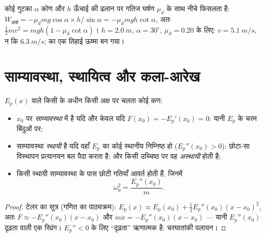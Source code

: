 \begin{example}[घर्षण में खोई ऊर्जा]\label{ex:b1:work-and-energy:friction}
कोई गुटका $\alpha$ कोण और $h$ ऊँचाई की ढलान पर गतिज घर्षण $\mu_d$ के साथ
नीचे फिसलता है: $W_{\text{असं}} = -\mu_dmg\cos\alpha \times
h/\sin\alpha = -\mu_dmgh\cot\alpha$, अतः $\tfrac12 mv^2 = mgh(1 - \mu_d\cot\alpha)$।
$h = \qty{2.0}{m}$, $\alpha = 30^\circ$, $\mu_d = 0.20$ के लिए: $v =
\qty{5.1}{m/s}$, न कि $\qty{6.3}{m/s}$;  का एक तिहाई ऊष्मा बन
गया।
\end{example}

\section{साम्यावस्था, स्थायित्व और कला-आरेख}

\begin{proposition}[एक विमा में साम्यावस्था और स्थायित्व]\label{prop:b1:work-and-energy:stability}
 $E_p(x)$ वाले किसी  के अधीन किसी अक्ष पर चलता कोई
कण:
\begin{itemize}
  \item $x_0$ पर \emph{साम्यावस्था} में है यदि और केवल यदि
        $F(x_0) = -E_p'(x_0) = 0$: यानी $E_p$ के चरम बिंदुओं पर;
  \item साम्यावस्था \emph{स्थायी} है यदि वहाँ $E_p$ का कोई स्थानीय
        निम्निष्ठ हो ($E_p''(x_0) > 0$): छोटा-सा विस्थापन प्रत्यानयन बल
        पैदा करता है; और किसी उच्चिष्ठ पर वह \emph{अस्थायी} होती है;
  \item किसी स्थायी साम्यावस्था के पास छोटी गतियाँ आवर्त होती हैं, जिनमें
        \[
        \omega_0^2 = \frac{E_p''(x_0)}{m} .
        \]
\end{itemize}
\end{proposition}

\begin{proof}
टेलर का सूत्र (गणित का पाठ्यक्रम): $E_p(x) \approx E_p(x_0) +
\tfrac12 E_p''(x_0)(x - x_0)^2$, अतः $F \approx -E_p''(x_0)(x - x_0)$ और
$m\ddot x = -E_p''(x_0)(x - x_0)$ --- यानी $E_p''(x_0)$ दृढ़ता वाली एक
स्प्रिंग। $E_p'' < 0$ के लिए ``दृढ़ता'' ऋणात्मक है: चरघातांकी पलायन।
\end{proof}

